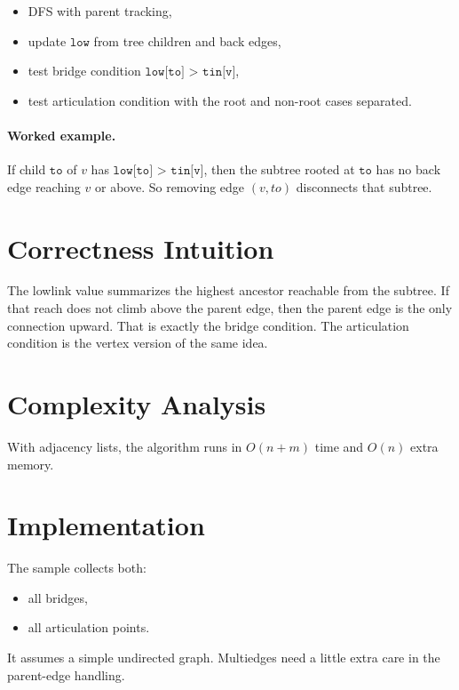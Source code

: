 \begin{itemize}
  \item DFS with parent tracking,
  \item update \(\texttt{low}\) from tree children and back edges,
  \item test bridge condition \(\texttt{low[to] > tin[v]}\),
  \item test articulation condition with the root and non-root cases separated.
\end{itemize}

\paragraph{Worked example.}
If child \(\texttt{to}\) of \(v\) has \(\texttt{low[to] > tin[v]}\), then the subtree rooted at \(\texttt{to}\) has no
back edge reaching \(v\) or above. So removing edge \((v, to)\) disconnects that subtree.

\section*{Correctness Intuition}

The lowlink value summarizes the highest ancestor reachable from the subtree. If that reach does not climb above the
parent edge, then the parent edge is the only connection upward. That is exactly the bridge condition. The articulation
condition is the vertex version of the same idea.

\section*{Complexity Analysis}

With adjacency lists, the algorithm runs in \(O(n + m)\) time and \(O(n)\) extra memory.

\section*{Implementation}

The sample collects both:

\begin{itemize}
  \item all bridges,
  \item all articulation points.
\end{itemize}

It assumes a simple undirected graph. Multiedges need a little extra care in the parent-edge handling.

